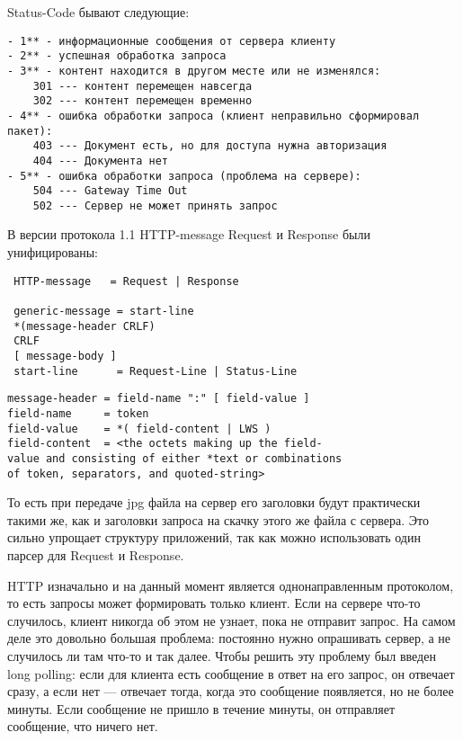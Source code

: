 Status-Code бывают следующие:
\begin{verbatim}
- 1** - информационные сообщения от сервера клиенту
- 2** - успешная обработка запроса
- 3** - контент находится в другом месте или не изменялся:
    301 --- контент перемещен навсегда
    302 --- контент перемещен временно
- 4** - ошибка обработки запроса (клиент неправильно сформировал пакет):
    403 --- Документ есть, но для доступа нужна авторизация
    404 --- Документа нет
- 5** - ошибка обработки запроса (проблема на сервере):
    504 --- Gateway Time Out
    502 --- Сервер не может принять запрос
\end{verbatim}
В версии протокола 1.1 HTTP-message Request и Response были унифицированы:
\begin{verbatim}
 HTTP-message   = Request | Response

 generic-message = start-line
 *(message-header CRLF)
 CRLF
 [ message-body ]
 start-line      = Request-Line | Status-Line
\end{verbatim}

\begin{verbatim}
message-header = field-name ":" [ field-value ]
field-name     = token
field-value    = *( field-content | LWS )
field-content  = <the octets making up the field-
value and consisting of either *text or combinations
of token, separators, and quoted-string>
\end{verbatim}
То есть при передаче jpg файла на сервер его заголовки будут практически такими же, как и заголовки запроса на скачку этого же файла с сервера. Это сильно упрощает структуру приложений, так как можно использовать один парсер для Request и Response.

HTTP изначально и на данный момент является однонаправленным протоколом, то есть запросы может формировать только клиент. Если на сервере что-то случилось, клиент никогда об этом не узнает, пока не отправит запрос. На самом деле это довольно большая проблема: постоянно нужно опрашивать сервер, а не случилось ли там что-то и так далее. Чтобы решить эту проблему был введен long polling: если для клиента есть сообщение в ответ на его запрос, он отвечает сразу, а если нет --- отвечает тогда, когда это сообщение появляется, но не более минуты. Если сообщение не пришло в течение минуты, он отправляет сообщение, что ничего нет.

